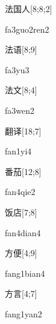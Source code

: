 \begin{verbete}{法国人}[8;8;2]
\begin{pronuncia}{fa3guo2ren2}
\end{pronuncia}
\end{verbete}

\begin{verbete}[fa3yu3]{法语}[8;9]
\begin{pronuncia}{fa3yu3}
\end{pronuncia}
\end{verbete}

\begin{verbete}[fa3wen2]{法文}[8;4]
\begin{pronuncia}{fa3wen2}
\end{pronuncia}
\end{verbete}

\begin{verbete}[fan1yi4]{翻译}[18;7]
\begin{pronuncia}{fan1yi4}
\end{pronuncia}
\end{verbete}

\begin{verbete}{番茄}[12;8]
\begin{pronuncia}{fan4qie2}
\end{pronuncia}
\end{verbete}

\begin{verbete}{饭店}[7;8]
\begin{pronuncia}{fan4dian4}
\end{pronuncia}
\end{verbete}

\begin{verbete}{方便}[4;9]
\begin{pronuncia}{fang1bian4}
\end{pronuncia}
\end{verbete}

\begin{verbete}{方言}[4;7]
\begin{pronuncia}{fang1yan2}
\end{pronuncia}
\end{verbete}

